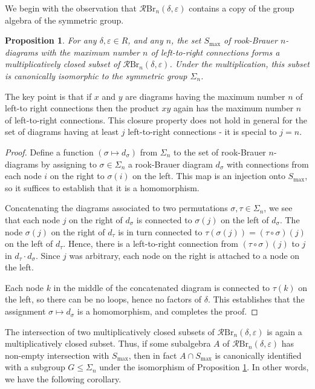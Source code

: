 \documentclass[12pt]{amsart}
\theoremstyle{plain}
\theoremstyle{definition} \newtheorem{definition}[theorem]{Definition}
\theoremstyle{plain}
\theoremstyle{plain} \newtheorem{proposition}[theorem]{Proposition}
\theoremstyle{plain} \newtheorem{conjecture}[theorem]{Conjecture}
\theoremstyle{plain} \newtheorem{corollary}[theorem]{Corollary}
\theoremstyle{remark} \newtheorem{claim}[theorem]{Claim}
\theoremstyle{remark} \newtheorem{remark}[theorem]{Remark}
\theoremstyle{remark} \newtheorem{example}[theorem]{Example}
\theoremstyle{remark} \newtheorem{comment}[theorem]{Comment}
\theoremstyle{definition} \newtheorem{question}[theorem]{Question}
\newcommand{\rook}{\mathcal{R}}
\newcommand{\Brauer}{\mathrm{Br}}
\begin{document}
We begin with the observation that $\rook \Brauer_n(\delta, \varepsilon)$ contains a copy of the group algebra of the symmetric group.

\begin{proposition} \label{symmetricGroup} For any $\delta, \varepsilon \in R$, and any $n$, the set $S_{\max}$ of rook-Brauer $n$-diagrams with the maximum number $n$ of left-to-right connections forms a multiplicatively closed subset of $\rook \Brauer_n(\delta, \varepsilon)$. Under the multiplication, this subset is canonically isomorphic to the symmetric group $\Sigma_n$. \end{proposition}

The key point is that if $x$ and $y$ are diagrams having the maximum number $n$ of left-to right connections then the product $xy$ again has the maximum number $n$ of left-to-right connections. This closure property does not hold in general for the set of diagrams having at least $j$ left-to-right connections - it is special to $j=n$.

\begin{proof} Define a function $(\sigma \mapsto d_\sigma)$ from $\Sigma_n$ to the set of rook-Brauer $n$-diagrams by assigning to $\sigma \in \Sigma_n$ a rook-Brauer diagram $d_\sigma$ with connections from each node $i$ on the right to $\sigma(i)$ on the left. This map is an injection onto $S_{\max}$, so it suffices to establish that it is a homomorphism.

Concatenating the diagrams associated to two permutations $\sigma, \tau \in \Sigma_n$, we see that each node $j$ on the right of $d_\sigma$ is connected to $\sigma(j)$ on the left of $d_\sigma$. The node $\sigma(j)$ on the right of $d_\tau$ is in turn connected to $\tau(\sigma(j))=(\tau \circ \sigma)(j)$ on the left of $d_\tau$. Hence, there is a left-to-right connection from $(\tau \circ \sigma)(j)$ to $j$ in $d_\tau \cdot d_\sigma$. Since $j$ was arbitrary, each node on the right is attached to a node on the left.

Each node $k$ in the middle of the concatenated diagram is connected to $\tau(k)$ on the left, so there can be no loops, hence no factors of $\delta$. This establishes that the assignment $\sigma \mapsto d_{\sigma}$ is a homomorphism, and completes the proof. \end{proof}

The intersection of two multiplicatively closed subsets of $\rook \Brauer_n(\delta, \varepsilon)$ is again a multiplicatively closed subset. Thus, if some subalgebra $A$ of $\rook \Brauer_n(\delta, \varepsilon)$ has non-empty intersection with $S_{\max}$, then in fact $A \cap S_{\max}$ is canonically identified with a subgroup $G \leq \Sigma_n$ under the isomorphism of Proposition \ref{symmetricGroup}. In other words, we have the following corollary.
\end{document}
